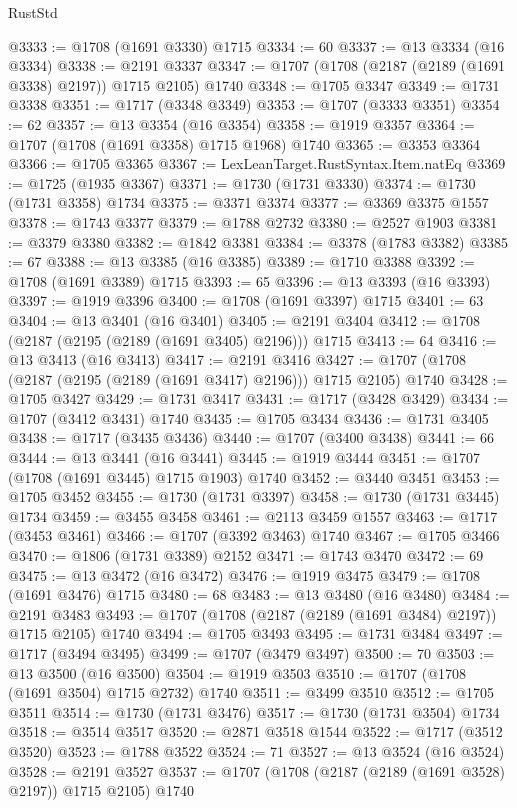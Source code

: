 \begin{lexlean}{RustStd}
\begin{coremodule}
@3333 := @1708 (@1691 @3330) @1715
@3334 := 60
@3337 := @13 @3334 (@16 @3334)
@3338 := @2191 @3337
@3347 := @1707 (@1708 (@2187 (@2189 (@1691 @3338) @2197)) @1715 @2105) @1740
@3348 := @1705 @3347
@3349 := @1731 @3338
@3351 := @1717 (@3348 @3349)
@3353 := @1707 (@3333 @3351)
@3354 := 62
@3357 := @13 @3354 (@16 @3354)
@3358 := @1919 @3357
@3364 := @1707 (@1708 (@1691 @3358) @1715 @1968) @1740
@3365 := @3353 @3364
@3366 := @1705 @3365
@3367 := LexLeanTarget.RustSyntax.Item.natEq
@3369 := @1725 (@1935 @3367)
@3371 := @1730 (@1731 @3330)
@3374 := @1730 (@1731 @3358) @1734
@3375 := @3371 @3374
@3377 := @3369 @3375 @1557
@3378 := @1743 @3377
@3379 := @1788 @2732
@3380 := @2527 @1903
@3381 := @3379 @3380
@3382 := @1842 @3381
@3384 := @3378 (@1783 @3382)
@3385 := 67
@3388 := @13 @3385 (@16 @3385)
@3389 := @1710 @3388
@3392 := @1708 (@1691 @3389) @1715
@3393 := 65
@3396 := @13 @3393 (@16 @3393)
@3397 := @1919 @3396
@3400 := @1708 (@1691 @3397) @1715
@3401 := 63
@3404 := @13 @3401 (@16 @3401)
@3405 := @2191 @3404
@3412 := @1708 (@2187 (@2195 (@2189 (@1691 @3405) @2196))) @1715
@3413 := 64
@3416 := @13 @3413 (@16 @3413)
@3417 := @2191 @3416
@3427 := @1707 (@1708 (@2187 (@2195 (@2189 (@1691 @3417) @2196))) @1715 @2105) @1740
@3428 := @1705 @3427
@3429 := @1731 @3417
@3431 := @1717 (@3428 @3429)
@3434 := @1707 (@3412 @3431) @1740
@3435 := @1705 @3434
@3436 := @1731 @3405
@3438 := @1717 (@3435 @3436)
@3440 := @1707 (@3400 @3438)
@3441 := 66
@3444 := @13 @3441 (@16 @3441)
@3445 := @1919 @3444
@3451 := @1707 (@1708 (@1691 @3445) @1715 @1903) @1740
@3452 := @3440 @3451
@3453 := @1705 @3452
@3455 := @1730 (@1731 @3397)
@3458 := @1730 (@1731 @3445) @1734
@3459 := @3455 @3458
@3461 := @2113 @3459 @1557
@3463 := @1717 (@3453 @3461)
@3466 := @1707 (@3392 @3463) @1740
@3467 := @1705 @3466
@3470 := @1806 (@1731 @3389) @2152
@3471 := @1743 @3470
@3472 := 69
@3475 := @13 @3472 (@16 @3472)
@3476 := @1919 @3475
@3479 := @1708 (@1691 @3476) @1715
@3480 := 68
@3483 := @13 @3480 (@16 @3480)
@3484 := @2191 @3483
@3493 := @1707 (@1708 (@2187 (@2189 (@1691 @3484) @2197)) @1715 @2105) @1740
@3494 := @1705 @3493
@3495 := @1731 @3484
@3497 := @1717 (@3494 @3495)
@3499 := @1707 (@3479 @3497)
@3500 := 70
@3503 := @13 @3500 (@16 @3500)
@3504 := @1919 @3503
@3510 := @1707 (@1708 (@1691 @3504) @1715 @2732) @1740
@3511 := @3499 @3510
@3512 := @1705 @3511
@3514 := @1730 (@1731 @3476)
@3517 := @1730 (@1731 @3504) @1734
@3518 := @3514 @3517
@3520 := @2871 @3518 @1544
@3522 := @1717 (@3512 @3520)
@3523 := @1788 @3522
@3524 := 71
@3527 := @13 @3524 (@16 @3524)
@3528 := @2191 @3527
@3537 := @1707 (@1708 (@2187 (@2189 (@1691 @3528) @2197)) @1715 @2105) @1740

\end{coremodule}
\end{lexlean}
